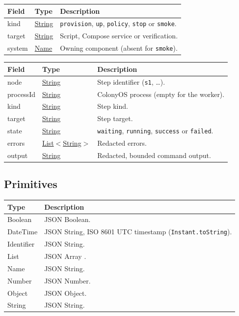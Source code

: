 \documentclass[a4paper]{arrowhead}
\newcommand{\pdef}[1]{{\textcolor{ArrowheadGrey}{#1 \label{sec:model:primitives:#1} \label{sec:model:primitives:#1s}}}}
\newcommand{\pref}[1]{{\textcolor{ArrowheadGrey}{\hyperref[sec:model:primitives:#1]{#1}}}}
\begin{document}

\noindent\begin{tabularx}{\textwidth}{| >{\raggedright\arraybackslash}p{3.6cm} | >{\raggedright\arraybackslash\small}p{4.4cm} | X |} \hline
\rowcolor{gray!33} Field & Type & Description \\ \hline
kind & \pref{String} & \texttt{provision}, \texttt{up}, \texttt{policy}, \texttt{stop} or \texttt{smoke}. \\ \hline
target & \pref{String} & Script, Compose service or verification. \\ \hline
system & \pref{Name} & Owning component (absent for \texttt{smoke}). \\ \hline
\end{tabularx}


\noindent\begin{tabularx}{\textwidth}{| >{\raggedright\arraybackslash}p{3.6cm} | >{\raggedright\arraybackslash\small}p{4.4cm} | X |} \hline
\rowcolor{gray!33} Field & Type & Description \\ \hline
node & \pref{String} & Step identifier (\texttt{s1}, \ldots). \\ \hline
processId & \pref{String} & ColonyOS process (empty for the worker). \\ \hline
kind & \pref{String} & Step kind. \\ \hline
target & \pref{String} & Step target. \\ \hline
state & \pref{String} & \texttt{waiting}, \texttt{running}, \texttt{success} or \texttt{failed}. \\ \hline
errors & \pref{List}$<$\pref{String}$>$ & Redacted errors. \\ \hline
output & \pref{String} & Redacted, bounded command output. \\ \hline
\end{tabularx}

\subsection{Primitives}
\label{sec:model:primitives}

\noindent\begin{tabularx}{\textwidth}{| p{4.6cm} | X |} \hline
\rowcolor{gray!33} Type & Description \\ \hline
\pdef{Boolean} & JSON Boolean. \\ \hline
\pdef{DateTime} & JSON String, ISO 8601 UTC timestamp (\texttt{Instant.toString}). \\ \hline
\pdef{Identifier} & JSON String. \\ \hline
\pdef{List} & JSON Array \cite{rfc8259}. \\ \hline
\pdef{Name} & JSON String. \\ \hline
\pdef{Number} & JSON Number. \\ \hline
\pdef{Object} & JSON Object. \\ \hline
\pdef{String} & JSON String. \\ \hline
\end{tabularx}
\end{document}
